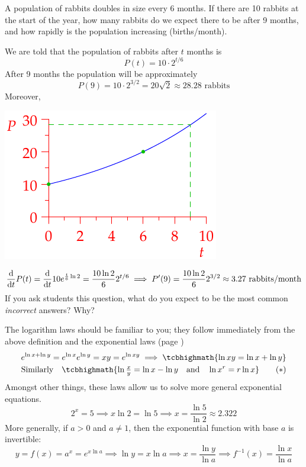 \begin{example}{}{}
A population of rabbits doubles in size every 6 months. If there are 10 rabbits at the start of the year, how many rabbits do we expect there to be after 9 months, and how rapidly is the population increasing (births/month).\par
\begin{minipage}[t]{0.6\linewidth}\vspace{-3pt}
  We are told that the population of rabbits after $t$ months is
  \[P(t)=10\cdot 2^{t/6}\]
  After 9 months the population will be approximately
  \[P(9)=10\cdot 2^{3/2}=20\sqrt 2\approx 28.28\text{ rabbits}\]
  Moreover,
  \end{minipage}\begin{minipage}[t]{0.4\linewidth}\vspace{-10pt}
  \flushright\includegraphics{rabbits}
  \end{minipage}\par\vspace{-3pt}
  \[
  \frac{\mathrm{d} }{\mathrm{d} t}P(t)=\frac{\mathrm{d} }{\mathrm{d} t}10e^{\frac t6\ln 2}=\frac{10\ln 2} 62^{t/6}
  \implies P'(9)=\frac{10\ln 2}62^{3/2}\approx 3.27\text{ rabbits/month}
  \]
  If you ask students this question, what do you expect to be the most common \emph{incorrect} answers? Why?
\end{example}


\goodbreak



The logarithm laws should be familiar to you; they follow immediately from the above definition and the exponential laws (page \pageref{pg:explaws})
\begin{gather*}
e^{\ln x+\ln y}=e^{\ln x}e^{\ln y}=xy=e^{\ln xy}\implies \tcbhighmath{\ln xy=\ln x+\ln y}\\
\text{Similarly}\quad \tcbhighmath{\ln\tfrac xy=\ln x-\ln y\quad\text{and}\quad \ln x^r=r\ln x}\tag{$\ast$}
\end{gather*}
Amongst other things, these laws allow us to solve more general exponential equations.
\[2^{x}=5\implies x\ln 2=\ln 5\implies x=\frac{\ln 5}{\ln 2}\approx 2.322\]
More generally, if $a>0$ and $a\neq 1$, then the exponential function with base $a$ is invertible:
\[y=f(x)=a^x=e^{x\ln a}\implies \ln y=x\ln a\implies x=\frac{\ln y}{\ln a}\implies f^{-1}(x)=\frac{\ln x}{\ln a}\]

